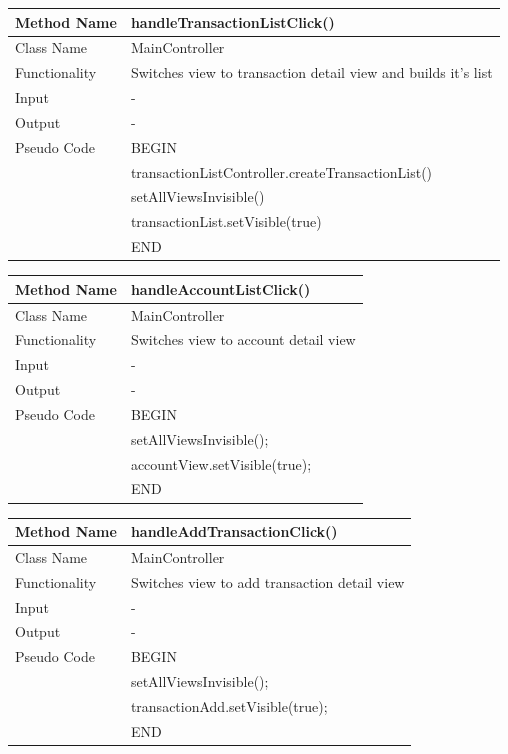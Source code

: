 \documentclass[12pt]{article}
\begin{document}
\begin{tabular}{ |p{3cm}||p{\colWidth}|  }
	\hline
	Method Name &  handleTransactionListClick() \\
	\hline
	Class Name & MainController\\
	\hline
	Functionality & Switches view to transaction detail view and builds it's list\\
	\hline
	Input &-\\
	\hline
	Output & -\\
	\hline
	Pseudo Code & BEGIN\\
	&	transactionListController.createTransactionList() \\
	&	setAllViewsInvisible() \\
	&	transactionList.setVisible(true) \\
	& END\\
	\hline
\end{tabular}    

\begin{tabular}{ |p{3cm}||p{\colWidth}|  }
	\hline
	Method Name &  handleAccountListClick() \\
	\hline
	Class Name & MainController\\
	\hline
	Functionality & Switches view to account detail view\\
	\hline
	Input &-\\
	\hline
	Output & -\\
	\hline
	Pseudo Code & BEGIN\\
	& setAllViewsInvisible();\\
	& accountView.setVisible(true);\\
	& END\\
	\hline
\end{tabular}    

\begin{tabular}{ |p{3cm}||p{\colWidth}|  }
	\hline
	Method Name &  handleAddTransactionClick() \\
	\hline
	Class Name & MainController\\
	\hline
	Functionality & Switches view to add transaction detail view\\
	\hline
	Input &-\\
	\hline
	Output & -\\
	\hline
	Pseudo Code & BEGIN\\
	&		setAllViewsInvisible();\\
	& 		transactionAdd.setVisible(true);\\
	& END\\
	\hline
\end{tabular}   
\end{document}
